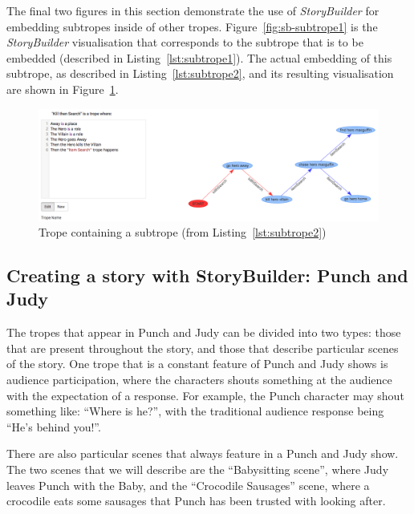 \documentclass[11pt]{report}
\begin{document}
The final two figures in this section demonstrate the use of \emph{StoryBuilder}
for embedding subtropes inside of other tropes. Figure~\ref{fig:sb-subtrope1} is
the \emph{StoryBuilder} visualisation that corresponds to the subtrope that is
to be embedded (described in Listing~\ref{lst:subtrope1}). The actual embedding
of this subtrope, as described in Listing~\ref{lst:subtrope2}, and its resulting visualisation are shown in Figure~\ref{fig:sb-subtrope2}.

\begin{figure}[!t]
\centerline{\includegraphics[width=\textwidth]{storybuilder-subtrope2.png}}
\caption{Trope containing a subtrope (from Listing~\ref{lst:subtrope2})}\label{fig:sb-subtrope2}
\end{figure}

\subsection{Creating a story with StoryBuilder: Punch and Judy}

The tropes that appear in Punch and Judy can be divided into two types: those
that are present throughout the story, and those that describe particular scenes
of the story. One trope that is a constant feature of Punch and Judy shows is
audience participation, where the characters shouts something at the audience
with the expectation of a response. For example, the Punch character may shout
something like: ``Where is he?'', with the traditional audience response being
``He's behind you!''.

There are also particular scenes that always feature in a Punch and Judy show.
The two scenes that we will describe are the ``Babysitting scene'', where Judy leaves Punch with the
Baby, and the ``Crocodile Sausages'' scene, where a crocodile eats some sausages
that Punch has been trusted with looking after.
\end{document}
